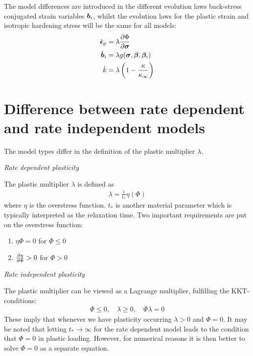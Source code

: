 \documentclass[10pt,a4paper]{article}
\begin{document}
The model differences are introduced in the different evolution laws back-stress conjugated strain variables $\ts{b}\inds{i}$, whilst the evolution laws for the plastic strain and isotropic hardening stress will be the same for all models:
\begin{align}
\tsd{\epsilon}\pl &= \lambda \pdiff[\Phi]{\ts{\sigma}} \\
\tsd{b}\inds{i} &= \lambda g(\ts{\sigma}, \ts{\beta}, \ts{\beta}\inds{i}) \\
\dot{k} &= \lambda\left(1-\frac{\kappa}{\kappa_\infty}\right)
\end{align}

\section{Difference between rate dependent and rate independent models}
The model types differ in the definition of the plastic multiplier $\lambda$.

\noindent\emph{Rate dependent plasticity}

The plastic multiplier $\lambda$ is defined as
\begin{align}
\lambda = \frac{1}{t_*}\eta(\Phi)
\end{align}
where $\eta$ is the overstress function. $t_*$ is another material parameter which is typically interpreted as the relaxation time. Two important requirements are put on the overstress function: 
\begin{enumerate}
\item	$\eta{\Phi}=0$ for $\Phi\leq 0$
\item	$\pdiff[\eta]{\Phi} > 0$ for $\Phi > 0$
\end{enumerate}

\noindent\emph{Rate independent plasticity}

The plastic multiplier can be viewed as a Lagrange multiplier, fulfilling the KKT-conditions:
\begin{align}
\Phi\leq 0, \quad \lambda\geq 0, \quad \Phi\lambda=0
\end{align}
These imply that whenever we have plasticity occurring $\lambda > 0$ and $\Phi = 0$. It may be noted that letting $t_*\rightarrow\infty$ for the rate dependent model leads to the condition that $\Phi=0$ in plastic loading. However, for numerical reasons it is then better to solve $\Phi=0$ as a separate equation. 
\end{document}
